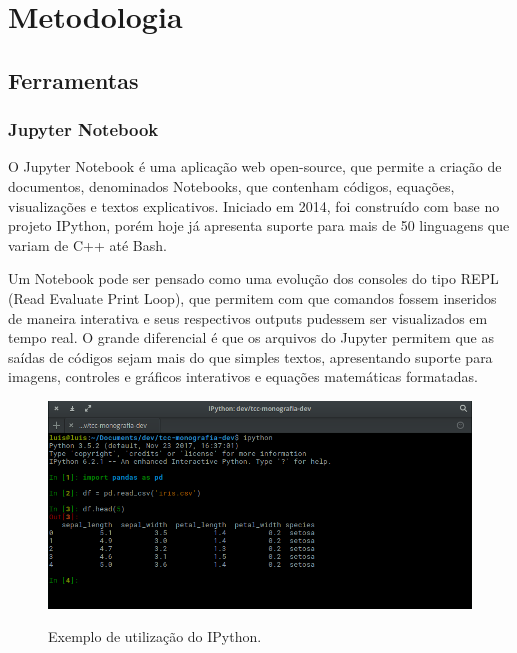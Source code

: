 \chapter{Metodologia}
\label{c.metodologia}

\section{Ferramentas}
\label{s.ferramentas}

\subsection{Jupyter Notebook}
\label{ss.jupyter}

O Jupyter Notebook é uma aplicação web open-source, que permite a criação de documentos, denominados Notebooks, que contenham códigos, equações, visualizações e textos explicativos. Iniciado em 2014, foi construído com base no projeto IPython, porém hoje já apresenta suporte para mais de 50 linguagens que variam de C++ até Bash.

Um Notebook pode ser pensado como uma evolução dos consoles do tipo REPL (Read Evaluate Print Loop), que permitem com que comandos fossem inseridos de maneira interativa e seus respectivos outputs pudessem ser visualizados em tempo real. O grande diferencial é que os arquivos do Jupyter permitem que as saídas de códigos sejam mais do que simples textos, apresentando suporte para imagens, controles e gráficos interativos e equações matemáticas formatadas. \cite{Kluyver:2016aa}

\begin{figure}[h]
\caption{\small Exemplo de utilização do IPython.}
\centering
\includegraphics[scale=0.40]{figs/exemplo-ipython.png}
\label{f.exemplo-ipython}
\end{figure}

